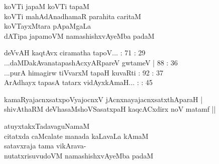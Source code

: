 \begin{entry}
\begin{shl}
koVTi japaM koVTi tapaM\\
koVTi mahAdAnadhamaR parahita caritaM\\
koVTayxMtara pApaMgaLa\\
dATipa japamoVM namashishxvAyeMba padaM
\end{shl}
\end{entry}

\begin{entry}
\gl{}
\info{}{}{}{}
\begin{shl}
deVvAH kaqtAvx ciramatha tapoV... : 71 : 29\\
...daMDakAvanatapashAcxyARpareV gwtameV | 88 : 36\\
...purA himagirw tiVvarxM tapaH kuvaRti : 92 : 37\\
ArAdhayx tapasA tatarx vidAyxkAmaH... : : 45
\end{shl}


\end{entry}

\begin{entry}
\begin{shl}
kamaRyajacnxsatxpoVyajocnxV jAcnxnayajacnxsatxthAparaH |\\
shivAthaRM deVhasaMshoVSasatxpaH kaqcACxdirx noV matamf ||
\end{shl}
\end{entry}

\begin{entry}
\begin{shl}
atuyxtakxTadavaguNamaM\\
citatxda caMcalate manada kaLavaLa kAmaM\\
satavxraja tama vikArava-\\
nutatxrisuvudoVM namashishxvAyeMba padaM
\end{shl}
\end{entry}

